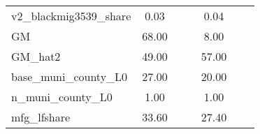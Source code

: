 \begin{table}[htbp]
\begin{tabular}{l*{2}{ccc}}
v2\_blackmig3539\_share&        0.03&            &            &        0.04&            &            \\
GM                  &       68.00&            &            &        8.00&            &            \\
GM\_hat2             &       49.00&            &            &       57.00&            &            \\
base\_muni\_county\_L0 &       27.00&            &            &       20.00&            &            \\
n\_muni\_county\_L0    &        1.00&            &            &        1.00&            &            \\
mfg\_lfshare         &       33.60&            &            &       27.40&            &            \\
\bottomrule
\end{tabular}
\end{table}

